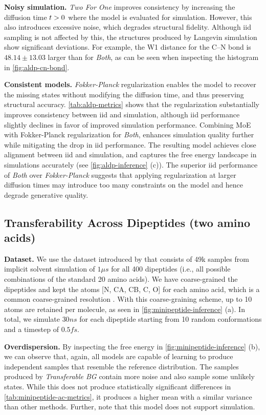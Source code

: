 \textbf{Noisy simulation.} 
\emph{Two For One} improves consistency by increasing the diffusion time ${t} > 0$ where the model is evaluated for simulation. However, this also introduces excessive noise, which degrades structural fidelity. Although iid sampling is not affected by this, the structures produced by Langevin simulation show significant deviations. For example, the W1 distance for the C--N bond is $48.14 \pm 13.03$ larger than for \emph{Both}, as can be seen when inspecting the histogram in \cref{fig:aldp-cn-bond}.

\textbf{Consistent models.} 
\emph{Fokker-Planck} regularization enables the model to recover the missing states without modifying the diffusion time, and thus preserving structural accuracy. \cref{tab:aldp-metrics} shows that the regularization substantially improves consistency between iid and simulation, although iid performance slightly declines in favor of improved simulation performance. 
Combining \gls{MoE} with Fokker-Planck regularization for \emph{Both}, enhances simulation quality further while mitigating the drop in iid performance. The resulting model achieves close alignment between iid and simulation, and captures the free energy landscape in simulations accurately (see \cref{fig:aldp-inference} (c)). The superior iid performance of \emph{Both} over \emph{Fokker-Planck} suggests that applying regularization at larger diffusion times may introduce too many constraints on the model and hence degrade generative quality.

\subsection{Transferability Across Dipeptides (two amino acids)}
\textbf{Dataset.} We use the dataset introduced by \cite{klein2023timewarp} that consists of 49k samples from implicit solvent simulation of $1\mu s$ for all 400 dipeptides (i.e., all possible combinations of the standard 20 amino acids). We have coarse-grained the dipeptides and kept the atoms [N, CA, CB, C, O] for each amino acid, which is a common coarse-grained resolution \citep{charron2023navigating}. With this coarse-graining scheme, up to 10 atoms are retained per molecule, as seen in \cref{fig:minipeptide-inference} (a). In total, we simulate $30ns$ for each dipeptide starting from 10 random conformations and a timestep of $0.5fs$.

\textbf{Overdispersion.} By inspecting the free energy in \cref{fig:minipeptide-inference} (b), we can observe that, again, all models are capable of learning to produce independent samples that resemble the reference distribution. The samples produced by \emph{Transferable \gls{BG}} contain more noise and also sample some unlikely states. While this does not produce statistically significant differences in \cref{tab:minipeptide-ac-metrics}, it produces a higher mean with a similar variance than other methods. Further, note that this model does not support simulation. 


